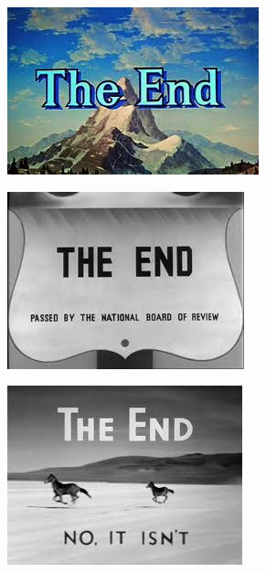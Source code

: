 \begin{frame}
   \centering
   \includegraphics[height=.99\textheight]{img/end2.png} \\
\end{frame}

\begin{frame}
   \centering
   \includegraphics[height=.99\textheight]{img/end3.png} \\
\end{frame}

\begin{frame}
   \centering
   \includegraphics[height=.99\textheight]{img/end4.png} \\
\end{frame}

